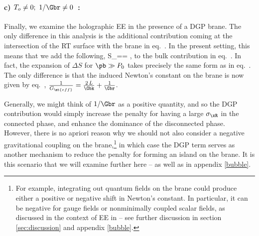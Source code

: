 
\begin{figure}[h]
	\def\svgwidth{0.9\linewidth}
\end{figure}

\paragraph{c) $T_o\ne 0;\ 1/\Gbr\ne 0$\ :} Finally, we examine the holographic EE in the presence of a DGP brane. The only difference in this analysis is the additional contribution coming at the intersection of the RT surface with the brane in eq.~.
In the present setting, this means that we add the following,
\beq\label{sample2}
S_==\,\pb\,,%
\eeq
to the bulk contribution in eq.~. In fact, the  expansion of $\Delta S$ for $\pb\gg P_0$ takes precisely the same form as in eq.~. The only difference is that the induced Newton's constant on the brane is now given by eq.~, \ie $\frac{1}{G_\mt{eff}}=\frac{2\,L}{\Gbk}+\frac{1}{\Gbr}$.

Generally, we might think of $1/\Gbr$ as a positive quantity, and so the DGP contribution  would simply increase the penalty for having a large $\sigma_\xR$ in the connected phase, and enhance the dominance of the disconnected phase. However, there is no apriori reason why we should not also consider a negative gravitational coupling on the brane,\footnote{For example, integrating out quantum fields on the brane could produce either a positive or negative shift in Newton's constant. In particular, it can be negative for gauge fields or nonminimally coupled scalar fields, as discussed in the context of EE in \cite{Larsen:1995ax,Kabat:1995eq} -- see further discussion in section \ref{sec:discussion} and appendix \ref{bubble}.} in which case the DGP term serves as another mechanism to reduce the penalty for forming an island on the brane. It is this scenario that we will examine further here -- as well as in appendix \ref{bubble}.

